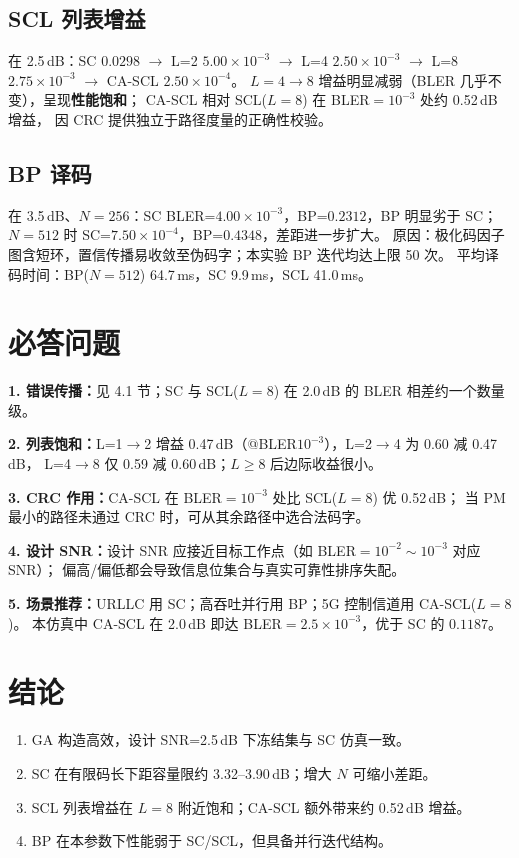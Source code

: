 \documentclass[12pt, a4paper]{article}
\begin{document}
\subsection{SCL 列表增益}
在 2.5\,dB：SC $0.0298$ $\to$ L=2 $5.00\times10^{-3}$ $\to$ L=4 $2.50\times10^{-3}$
$\to$ L=8 $2.75\times10^{-3}$ $\to$ CA-SCL $2.50\times10^{-4}$。
$L=4\to 8$ 增益明显减弱（BLER 几乎不变），呈现\textbf{性能饱和}；
CA-SCL 相对 SCL($L=8$) 在 BLER$=10^{-3}$ 处约 0.52\,dB 增益，
因 CRC 提供独立于路径度量的正确性校验。

\subsection{BP 译码}
在 3.5\,dB、$N=256$：SC BLER=$4.00\times10^{-3}$，BP=$0.2312$，BP 明显劣于 SC；
$N=512$ 时 SC=$7.50\times10^{-4}$，BP=$0.4348$，差距进一步扩大。
原因：极化码因子图含短环，置信传播易收敛至伪码字；本实验 BP 迭代均达上限 50 次。
平均译码时间：BP($N=512$) 64.7\,ms，SC 9.9\,ms，SCL 41.0\,ms。

\section{必答问题}
\textbf{1. 错误传播：}见 4.1 节；SC 与 SCL($L=8$) 在 2.0\,dB 的 BLER 相差约一个数量级。

\textbf{2. 列表饱和：}L=1$\to$2 增益 0.47\,dB（@BLER$10^{-3}$），L=2$\to$4 为 0.60 减 0.47\,dB，
L=4$\to$8 仅 0.59 减 0.60\,dB；$L\ge 8$ 后边际收益很小。

\textbf{3. CRC 作用：}CA-SCL 在 BLER$=10^{-3}$ 处比 SCL($L=8$) 优 0.52\,dB；
当 PM 最小的路径未通过 CRC 时，可从其余路径中选合法码字。

\textbf{4. 设计 SNR：}设计 SNR 应接近目标工作点（如 BLER$=10^{-2}\sim10^{-3}$ 对应 SNR）；
偏高/偏低都会导致信息位集合与真实可靠性排序失配。

\textbf{5. 场景推荐：}URLLC 用 SC；高吞吐并行用 BP；5G 控制信道用 CA-SCL($L=8$)。
本仿真中 CA-SCL 在 2.0\,dB 即达 BLER$=2.5\times10^{-3}$，优于 SC 的 $0.1187$。

\section{结论}
\begin{enumerate}
  \item GA 构造高效，设计 SNR=2.5\,dB 下冻结集与 SC 仿真一致。
  \item SC 在有限码长下距容量限约 3.32--3.90\,dB；增大 $N$ 可缩小差距。
  \item SCL 列表增益在 $L=8$ 附近饱和；CA-SCL 额外带来约 0.52\,dB 增益。
  \item BP 在本参数下性能弱于 SC/SCL，但具备并行迭代结构。
\end{enumerate}
\end{document}
